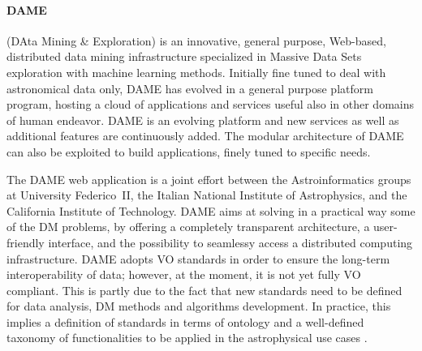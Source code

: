 \documentclass[a4paper,10pt,oneside,onecolumn]{article}
\begin{document}

    \paragraph{DAME}


    (DAta Mining \& Exploration) is an innovative, general purpose,
    Web-based, distributed data mining infrastructure specialized in
    Massive Data Sets exploration with machine learning
    methods. Initially fine tuned to deal with astronomical data only,
    DAME has evolved in a general purpose platform program, hosting a
    cloud of applications and services useful also in other domains of
    human endeavor. DAME is an evolving platform and new services as
    well as additional features are continuously added. The modular
    architecture of DAME can also be exploited to build applications,
    finely tuned to specific needs. 

    The DAME web application is a joint effort between the
    Astroinformatics groups at University Federico~II, the Italian
    National Institute of Astrophysics, and the California Institute
    of Technology.  DAME aims at solving in a practical way some of
    the DM problems, by offering a completely transparent
    architecture, a user-friendly interface, and the possibility to
    seamlessy access a distributed computing infrastructure. DAME
    adopts VO standards in order to ensure the long-term
    interoperability of data; however, at the moment, it is not yet
    fully VO compliant. This is partly due to the fact that new
    standards need to be defined for data analysis, DM methods and
    algorithms development. In practice, this implies a definition of
    standards in terms of ontology and a well-defined taxonomy of
    functionalities to be applied in the astrophysical use cases
    \cite{brescia2011extracting}.






\end{document}
